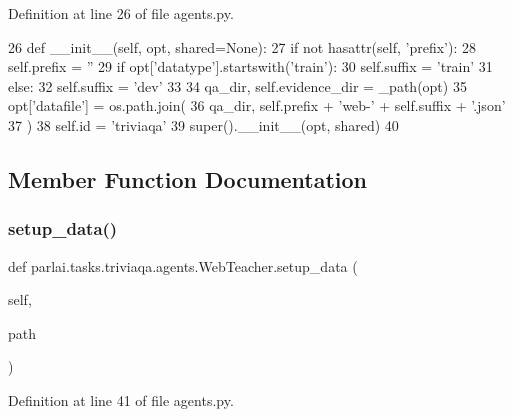 Definition at line 26 of file agents.\+py.


\begin{DoxyCode}
26     \textcolor{keyword}{def }\_\_init\_\_(self, opt, shared=None):
27         \textcolor{keywordflow}{if} \textcolor{keywordflow}{not} hasattr(self, \textcolor{stringliteral}{'prefix'}):
28             self.prefix = \textcolor{stringliteral}{''}
29             \textcolor{keywordflow}{if} opt[\textcolor{stringliteral}{'datatype'}].startswith(\textcolor{stringliteral}{'train'}):
30                 self.suffix = \textcolor{stringliteral}{'train'}
31             \textcolor{keywordflow}{else}:
32                 self.suffix = \textcolor{stringliteral}{'dev'}
33 
34         qa\_dir, self.evidence\_dir = \_path(opt)
35         opt[\textcolor{stringliteral}{'datafile'}] = os.path.join(
36             qa\_dir, self.prefix + \textcolor{stringliteral}{'web-'} + self.suffix + \textcolor{stringliteral}{'.json'}
37         )
38         self.id = \textcolor{stringliteral}{'triviaqa'}
39         super().\_\_init\_\_(opt, shared)
40 
\end{DoxyCode}


\subsection{Member Function Documentation}
\mbox{\label{classparlai_1_1tasks_1_1triviaqa_1_1agents_1_1WebTeacher_a781004317ce0bb925ecf0a51783a3fa0}} 
\subsubsection{\texorpdfstring{setup\+\_\+data()}{setup\_data()}}
{\footnotesize\ttfamily def parlai.\+tasks.\+triviaqa.\+agents.\+Web\+Teacher.\+setup\+\_\+data (\begin{DoxyParamCaption}\item[{}]{self,  }\item[{}]{path }\end{DoxyParamCaption})}



Definition at line 41 of file agents.\+py.


